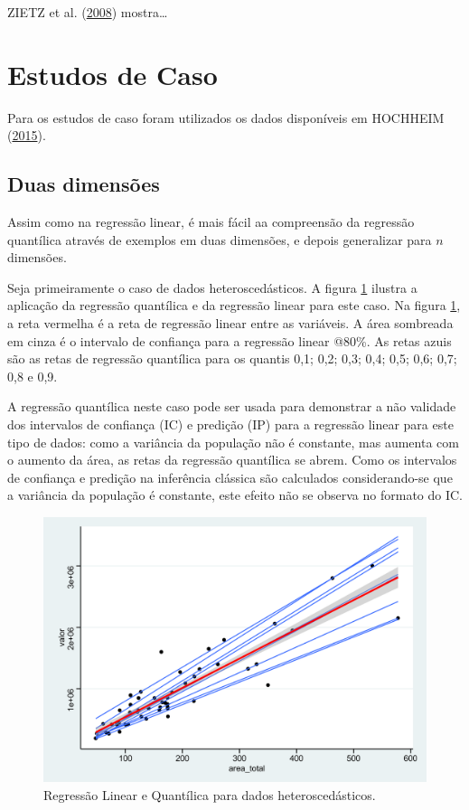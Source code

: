 \documentclass[a4paper, 12pt]{article}
\begin{document}
ZIETZ et al. (\protect\hyperlink{ref-Zietz}{2008}) mostra\ldots{}

\hypertarget{estudos-de-caso}{%
\section{Estudos de Caso}\label{estudos-de-caso}}

Para os estudos de caso foram utilizados os dados disponíveis em
HOCHHEIM (\protect\hyperlink{ref-hochheim}{2015}).

\hypertarget{duas-dimensoes}{%
\subsection{Duas dimensões}\label{duas-dimensoes}}

Assim como na regressão linear, é mais fácil aa compreensão da regressão
quantílica através de exemplos em duas dimensões, e depois generalizar
para \(n\) dimensões.

Seja primeiramente o caso de dados heteroscedásticos. A figura
\ref{fig:qr1} ilustra a aplicação da regressão quantílica e da regressão
linear para este caso. Na figura \ref{fig:qr1}, a reta vermelha é a reta
de regressão linear entre as variáveis. A área sombreada em cinza é o
intervalo de confiança para a regressão linear @80\%. As retas azuis são
as retas de regressão quantílica para os quantis 0,1; 0,2; 0,3; 0,4;
0,5; 0,6; 0,7; 0,8 e 0,9.

A regressão quantílica neste caso pode ser usada para demonstrar a não
validade dos intervalos de confiança (IC) e predição (IP) para a
regressão linear para este tipo de dados: como a variância da população
não é constante, mas aumenta com o aumento da área, as retas da
regressão quantílica se abrem. Como os intervalos de confiança e
predição na inferência clássica são calculados considerando-se que a
variância da população é constante, este efeito não se observa no
formato do IC.

\begin{figure}[H]

{\centering \includegraphics[width=0.7\linewidth]{images/qr1-1} 

}

\caption{Regressão Linear e Quantílica para dados heteroscedásticos.}\label{fig:qr1}
\end{figure}
\end{document}
